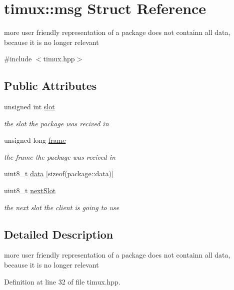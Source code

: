 \hypertarget{structtimux_1_1msg}{\section{timux\+:\+:msg Struct Reference}
\label{structtimux_1_1msg}
}


more user friendly representation of a package does not containn all data, because it is no longer relevant  




{\ttfamily \#include $<$timux.\+hpp$>$}

\subsection*{Public Attributes}
\begin{DoxyCompactItemize}
\item 
unsigned int \hyperlink{structtimux_1_1msg_a481b3c7ec060f879e5ed008d71b4cdde}{slot}
\begin{DoxyCompactList}\small\item\em the slot the package was recived in \end{DoxyCompactList}\item 
unsigned long \hyperlink{structtimux_1_1msg_afe8a25b0d19b93d45bfb4326c423230d}{frame}
\begin{DoxyCompactList}\small\item\em the frame the package was recived in \end{DoxyCompactList}\item 
uint8\+\_\+t \hyperlink{structtimux_1_1msg_af27ad97558c3e1bcb2a8adde1cf25db6}{data} \mbox{[}sizeof(package\+::data)\mbox{]}
\item 
uint8\+\_\+t \hyperlink{structtimux_1_1msg_ac5e20000d09f9356645ce25a522466cf}{next\+Slot}
\begin{DoxyCompactList}\small\item\em the next slot the client is going to use \end{DoxyCompactList}\end{DoxyCompactItemize}


\subsection{Detailed Description}
more user friendly representation of a package does not containn all data, because it is no longer relevant 

Definition at line 32 of file timux.\+hpp.



